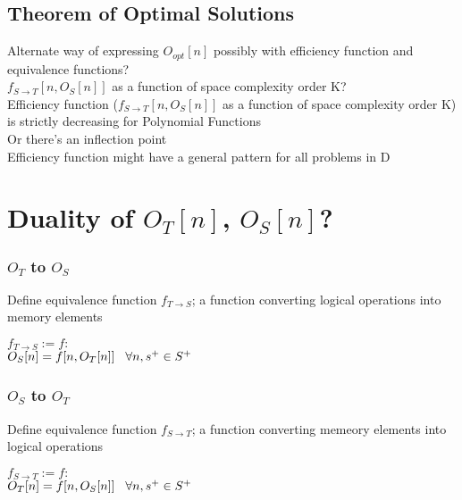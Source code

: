 \documentclass[11pt]{article}
\begin{document}
\subsection{Theorem of Optimal Solutions}
Alternate way of expressing $O_{opt}[n]$ possibly with efficiency function and equivalence functions?\\
$f_{S \rightarrow T}[n,O_S[n]]$ as a function of space complexity order K?\\
Efficiency function ($f_{S \rightarrow T}[n,O_S[n]]$ as a function of space complexity order K) is strictly decreasing for Polynomial Functions\\
Or there's an inflection point\\
Efficiency function might have a general pattern for all problems in D












\newpage
\section{Duality of $O_T[n]$, $O_S[n]$?}
\subsubsection{$O_T$ to $O_S$}
Define equivalence function $f_{T \rightarrow S}$; a function converting logical operations into memory elements
\begin{center}
$
f_{T \rightarrow S} := f :
$
\\ \vspace{2mm}
$
O_S[n] = f[n,O_T[n]] \hspace{3mm} \forall n, s^+ \in S^+
$
\end{center}

\subsubsection{$O_S$ to $O_T$}
Define equivalence function $f_{S \rightarrow T}$; a function converting memeory elements into logical operations
\begin{center}
$
f_{S \rightarrow T} := f :
$
\\ \vspace{2mm}
$
O_T[n] = f[n,O_S[n]] \hspace{3mm} \forall n, s^+ \in S^+
$
\end{center}
\end{document}
